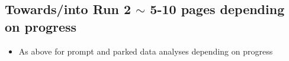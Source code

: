 \documentclass[12pt]{article}
\begin{document}
\subsection{Towards/into Run 2 $\sim$ 5-10 pages depending on progress}
\label{sec:run2}
\begin{itemize}
\item As above for prompt and parked data analyses depending on progress
\end{itemize}
\end{document}
